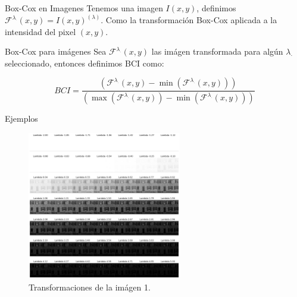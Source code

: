 \documentclass{beamer}
\begin{document}
\begin{frame}{Box-Cox en Imagenes}
    Tenemos una imagen $I(x, y)$, definimos $\mathcal{F}^{\lambda_{\cdot}}(x, y) = I(x, y)^{(\lambda)}$. Como la transformación Box-Cox aplicada a la intensidad del pixel $(x, y)$.
    \begin{block}{Box-Cox para im\'agenes}
        Sea $\mathcal{F}^{\lambda_{\cdot}}(x, y)$ las im\'agen transformada para alg\'un $\lambda_\cdot$ seleccionado, entonces definimos BCI como:

    \begin{equation}
        BCI = \frac{\left(\mathcal{F}^{\lambda_{\cdot}}(x, y) - \min\left(\mathcal{F}^{\lambda_{\cdot}}(x, y)\right)\right)}{\left(\max\left(\mathcal{F}^{\lambda_{\cdot}}(x, y)\right) - \min\left(\mathcal{F}^{\lambda_{\cdot}}(x, y)\right)\right)}
    \end{equation}
    \end{block}
\end{frame}

\begin{frame}{Ejemplos}
    \begin{figure}
        \centering
        \includegraphics[width=0.6\textwidth]{all_lambda_1.png}
        \caption{Transformaciones de la im\'agen 1.}
        \label{fig:all_lambda_1}
    \end{figure}
\end{frame}
\end{document}
